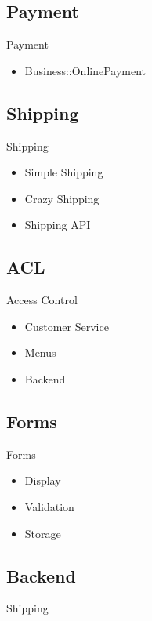 \subsection{Payment}
\begin{frame}{Payment}
\begin{itemize}
\item Business::OnlinePayment
\end{itemize}
\end{frame}

\subsection{Shipping}
\begin{frame}{Shipping}
\begin{itemize}
\item Simple Shipping
\item Crazy Shipping
\item Shipping API
\end{itemize}
\end{frame}

\subsection{ACL}
\begin{frame}{Access Control}
\begin{itemize}
\item Customer Service
\item Menus
\item Backend
\end{itemize}
\end{frame}

\subsection{Forms}
\begin{frame}{Forms}
\begin{itemize}
\item Display
\item Validation
\item Storage
\end{itemize}
\end{frame}

\subsection{Backend}
\begin{frame}{Shipping}
\end{frame}

